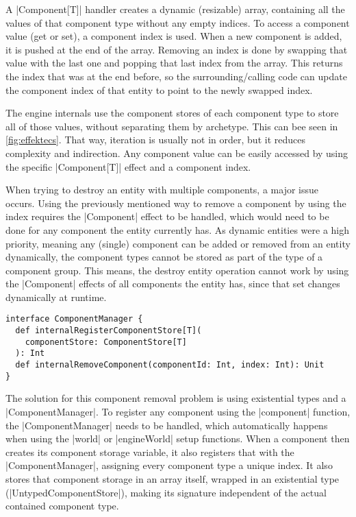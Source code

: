 A |Component[T]| handler creates a dynamic (resizable) array, containing all the values of that component type without any empty indices. To access a component value (get or set), a component index is used. When a new component is added, it is pushed at the end of the array. Removing an index is done by swapping that value with the last one and popping that last index from the array. This returns the index that was at the end before, so the surrounding/calling code can update the component index of that entity to point to the newly swapped index.

The engine internals use the component stores of each component type to store all of those values, without separating them by archetype. This can bee seen in \cref{fig:effektecs}. That way, iteration is usually not in order, but it reduces complexity and indirection. Any component value can be easily accessed by using the specific |Component[T]| effect and a component index.

When trying to destroy an entity with multiple components, a major issue occurs. Using the previously mentioned way to remove a component by using the index requires the |Component| effect to be handled, which would need to be done for any component the entity currently has. As dynamic entities were a high priority, meaning any (single) component can be added or removed from an entity dynamically, the component types cannot be stored as part of the type of a component group. This means, the destroy entity operation cannot work by using the |Component| effects of all components the entity has, since that set changes dynamically at runtime.

\begin{lstlisting}[caption=ComponentManager signiture]
interface ComponentManager {
  def internalRegisterComponentStore[T](
    componentStore: ComponentStore[T]
  ): Int
  def internalRemoveComponent(componentId: Int, index: Int): Unit
}
\end{lstlisting}

The solution for this component removal problem is using existential types and a |ComponentManager|. To register any component using the |component| function, the |ComponentManager| needs to be handled, which automatically happens when using the |world| or |engineWorld| setup functions. When a component then creates its component storage variable, it also registers that with the |ComponentManager|, assigning every component type a unique index. It also stores that component storage in an array itself, wrapped in an existential type (|UntypedComponentStore|), making its signature independent of the actual contained component type.

